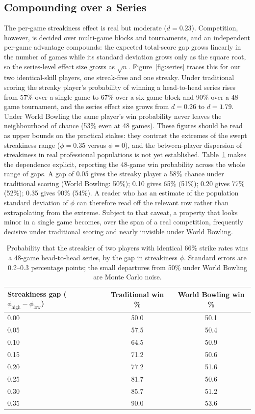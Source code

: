 \documentclass[USenglish]{article}
\theoremstyle{dgthm}
\theoremstyle{dgdef}
\begin{document}
\subsection{Compounding over a Series}

The per-game streakiness effect is real but moderate ($d = 0.23$). Competition, however, is decided over multi-game blocks and tournaments, and an independent per-game advantage compounds: the expected total-score gap grows linearly in the number of games while its standard deviation grows only as the square root, so the series-level effect size grows as $\sqrt{n}$. Figure~\ref{fig:series} traces this for our two identical-skill players, one streak-free and one streaky. Under traditional scoring the streaky player's probability of winning a head-to-head series rises from 57\% over a single game to 67\% over a six-game block and 90\% over a 48-game tournament, and the series effect size grows from $d = 0.26$ to $d = 1.79$. Under World Bowling the same player's win probability never leaves the neighbourhood of chance (53\% even at 48 games). These figures should be read as upper bounds on the practical stakes: they contrast the extremes of the swept streakiness range ($\phi = 0.35$ versus $\phi = 0$), and the between-player dispersion of streakiness in real professional populations is not yet established. Table~\ref{tab:seriesgap} makes the dependence explicit, reporting the 48-game win probability across the whole range of gaps. A gap of 0.05 gives the streaky player a 58\% chance under traditional scoring (World Bowling: 50\%); 0.10 gives 65\% (51\%); 0.20 gives 77\% (52\%); 0.35 gives 90\% (54\%). A reader who has an estimate of the population standard deviation of $\phi$ can therefore read off the relevant row rather than extrapolating from the extreme. Subject to that caveat, a property that looks minor in a single game becomes, over the span of a real competition, frequently decisive under traditional scoring and nearly invisible under World Bowling.

\begin{table}[!ht]
\caption{Probability that the streakier of two players with identical 66\% strike rates wins a 48-game head-to-head series, by the gap in streakiness $\phi$. Standard errors are 0.2--0.3 percentage points; the small departures from 50\% under World Bowling are Monte Carlo noise.}
\begin{tabular}{lcc}
Streakiness gap ($\phi_{\text{high}} - \phi_{\text{low}}$) & Traditional win \% & World Bowling win \% \\ \midrule
0.00 & 50.0 & 50.1 \\
0.05 & 57.5 & 50.4 \\
0.10 & 64.5 & 50.9 \\
0.15 & 71.2 & 50.6 \\
0.20 & 77.2 & 51.6 \\
0.25 & 81.7 & 50.6 \\
0.30 & 85.7 & 51.2 \\
0.35 & 90.0 & 53.6 \\
\end{tabular}
\label{tab:seriesgap}
\end{table}
\end{document}

